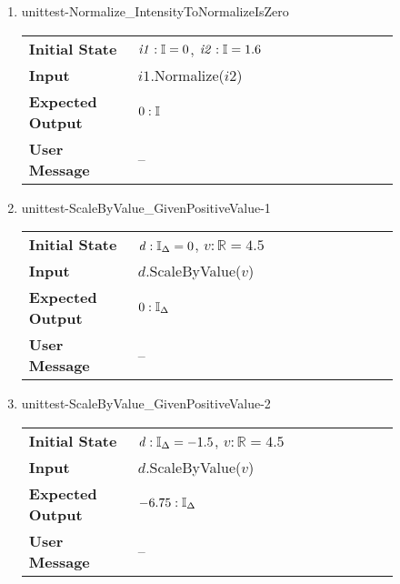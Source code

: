 \begin{enumerate}
    \item{unittest-Normalize\_IntensityToNormalizeIsZero}
    \begin{table}[H]
        \centering
        \begin{tabular}{P{0.25\linewidth}P{0.6\linewidth}}
            \toprule
            \textbf{Initial State} & $\mathit{i1} : \mathbb{I} = 0$,
            $\mathit{i2} : \mathbb{I} = 1.6$ \\
            \textbf{Input} &
            $\mathit{i1}$.Normalize($\mathit{i2}$) \\
            \midrule
            \textbf{Expected Output} & $0 : \mathbb{I}$ \\
            \textbf{User Message} & -- \\ \bottomrule
        \end{tabular}
    \end{table}

    \item{unittest-ScaleByValue\_GivenPositiveValue-1}
    \begin{table}[H]
        \centering
        \begin{tabular}{P{0.25\linewidth}P{0.6\linewidth}}
            \toprule
            \textbf{Initial State} & $\mathit{d} : \mathbb{I}_{\Delta} = 0$,
            $v : \mathbb{R} = 4.5$ \\
            \textbf{Input} & $\mathit{d}$.ScaleByValue($\mathit{v}$) \\
            \midrule
            \textbf{Expected Output} & $0 : \mathbb{I}_{\Delta}$ \\
            \textbf{User Message} & -- \\ \bottomrule
        \end{tabular}
    \end{table}

    \item{unittest-ScaleByValue\_GivenPositiveValue-2}
    \begin{table}[H]
        \centering
        \begin{tabular}{P{0.25\linewidth}P{0.6\linewidth}}
            \toprule
            \textbf{Initial State} & $\mathit{d} : \mathbb{I}_{\Delta} = -1.5$,
            $v : \mathbb{R} = 4.5$ \\
            \textbf{Input} & $\mathit{d}$.ScaleByValue($\mathit{v}$) \\
            \midrule
            \textbf{Expected Output} & $-6.75 : \mathbb{I}_{\Delta}$ \\
            \textbf{User Message} & -- \\ \bottomrule
        \end{tabular}
    \end{table}


\end{enumerate}
